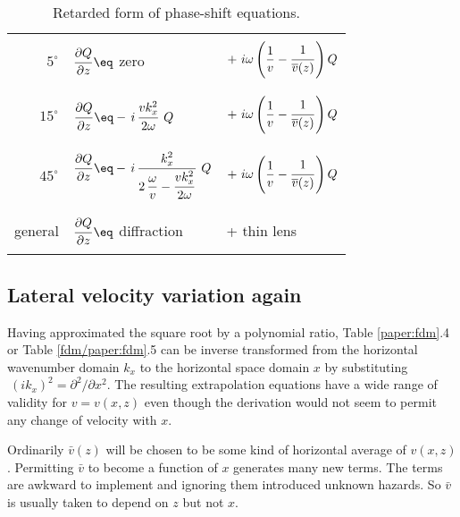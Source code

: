 {\begin{table}
\begin{center}
\begin{tabular}{|r|ll|}
     &     &  \\
$5^\circ$ & $\displaystyle {\strut\partial Q\over
             \partial z} \eq $ zero
& $+\ i\omega \left( \displaystyle {1\over v} - 
  {\strut 1\over\overline{v}(z)} \right) Q$ \\
     &     &   \\   \hline
     &     &   \\
$15^\circ$ & $\displaystyle {\strut\partial Q\over
             \partial z} \eq - \,i\, {\displaystyle 
             {\strut v k_x^2\over 2\omega}} \ Q$ 
& $+\ i\omega \left( \displaystyle {1\over v} - 
  {\strut 1\over\overline{v}(z)} \right) Q$    \\
     &     &   \\      \hline
     &     &   \\
$45^\circ$ & $\displaystyle {\strut\partial Q\over
             \partial z} \eq - \,i\, {\displaystyle 
             {\strut k_x^2}\over\displaystyle 
             {2\,{\omega\over v} - {\strut v k_x^2
             \over 2\omega}}} \ Q$ 
& $+\ i\omega \left(\displaystyle {1\over v} - 
  {\strut 1\over\overline{v}(z)} \right) Q$ \\
     &     &   \\       \hline
     &     &   \\       
{\rm general} & $\displaystyle {\strut\partial Q\over
                \partial z} \eq $ {\rm diffraction} 
 & + {\rm thin lens} \\
     &     &   \\       \hline
\end{tabular}
\end{center}
\label{eqn:1-4}
\caption{Retarded form of phase-shift equations.}
\end{table}
\subsection{Lateral velocity variation again}
\par
Having approximated the square root by a polynomial ratio,
Table \ref{paper:fdm}.4 or Table \ref{fdm/paper:fdm}.5 can be inverse transformed
from the horizontal wavenumber domain  $ k_x $  to the
horizontal space domain  $x$  by substituting
$ \  (ik_x )^2  =  \partial^2 / \partial x^2$.
The resulting extrapolation equations have a 
wide range of validity for  $v = v(x,z)$  even though the
derivation would not seem to permit any change of velocity with $x$.
\par
Ordinarily $\bar v(z)$ will be chosen
to be some kind of horizontal average of $v(x,z)$.
Permitting $\bar v$ to become a function of $x$ generates many
new terms.
The terms are awkward to implement and ignoring them introduced
unknown hazards.
So $\bar v$ is usually taken to depend on $z$ but not $x$.
}
